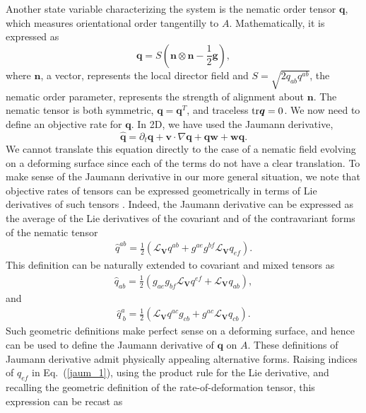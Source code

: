 Another state variable characterizing the system is the nematic order tensor $\bm{q}$, which measures orientational order tangentilly to $A$. Mathematically, it is expressed as
\begin{equation} \label{27_II}
	\bm{q} = S\left(\bm{n}\otimes\bm{n} - \frac{1}{2}\bm{g}\right),
\end{equation}
where $\bm{n}$, a vector, represents the local director field and $S=\sqrt{2q_{ab}q^{ab}}$, the nematic order parameter, represents the strength of alignment about $\bm{n}$. The nematic tensor is both symmetric, $\bm{q} = \bm{q}^T$, and traceless $\textup{tr}\bm{q}=0$. We now need to define an objective rate for $\bm{q}$. In 2D, we have used the Jaumann derivative,
\begin{equation}\label{eq6:Lie-der-q}
	\widehat{\bm{q}} = \partial_t\bm{q} + \bm{v}\cdot\nabla\bm{q} + \bm{q}\bm{w} + \bm{w}\bm{q}.
\end{equation}
We cannot translate this equation directly to the case of a nematic field evolving on a deforming surface since each of the terms do not have a clear translation. To make sense of the Jaumann derivative in our more general situation, we note that objective rates of tensors can be expressed geometrically in terms of Lie derivatives of such tensors \cite{marsden1994}. Indeed, the Jaumann derivative can be expressed as the average of the Lie derivatives of the covariant and of the contravariant forms of the nematic tensor 
\begin{align}\label{jaum_1}
	\widehat{q}^{ab}  = \frac{1}{2}\left(\mathcal{L}_{\bm{V}} q^{ab}  +  g^{ae}g^{bf} \mathcal{L}_{\bm{V}} q_{ef}  \right). 
\end{align}
This definition can be naturally extended to covariant and mixed tensors as
\begin{align}
	\widehat{q}_{ab}  = \frac{1}{2}\left(g_{ae}g_{bf} \mathcal{L}_{\bm{V}} q^{ef}  + \mathcal{L}_{\bm{V}} q_{ab}  \right), 
\end{align}
and 
\begin{align}
	\widehat{q}^a_{~b}  = \frac{1}{2}\left(\mathcal{L}_{\bm{V}} q^{ac} g_{cb}  +  g^{ac} \mathcal{L}_{\bm{V}} q_{cb}  \right).  
\end{align}
Such geometric definitions make perfect sense on a deforming surface, and hence can be used to define the Jaumann derivative of $\bm{q}$ on $A$. These definitions of Jaumann derivative admit physically appealing alternative forms. Raising indices of $q_{ef}$ in Eq.~(\ref{jaum_1}), using the product rule for the Lie derivative, and recalling the geometric definition of the rate-of-deformation tensor, this expression can be recast as
